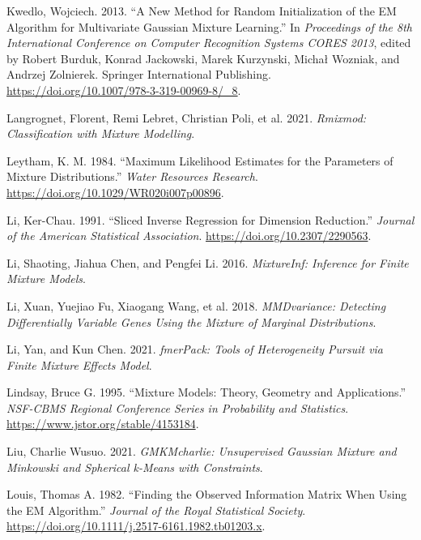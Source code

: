 \begin{CSLReferences}{1}{0}
\leavevmode{}%
Kwedlo, Wojciech. 2013. {``A {New Method} for {Random Initialization} of the {EM Algorithm} for {Multivariate Gaussian Mixture Learning}.''} In \emph{Proceedings of the {8th International Conference} on {Computer Recognition Systems CORES 2013}}, edited by Robert Burduk, Konrad Jackowski, Marek Kurzynski, Michał Wozniak, and Andrzej Zolnierek. Springer International Publishing. \url{https://doi.org/10.1007/978-3-319-00969-8/_8}.

\leavevmode{}%
Langrognet, Florent, Remi Lebret, Christian Poli, et al. 2021. \emph{Rmixmod: Classification with Mixture Modelling}.

\leavevmode{}%
Leytham, K. M. 1984. {``Maximum {Likelihood Estimates} for the {Parameters} of {Mixture Distributions}.''} \emph{Water Resources Research}. \url{https://doi.org/10.1029/WR020i007p00896}.

\leavevmode{}%
Li, Ker-Chau. 1991. {``Sliced {Inverse} {Regression} for {Dimension} {Reduction}.''} \emph{Journal of the American Statistical Association}. \url{https://doi.org/10.2307/2290563}.

\leavevmode{}%
Li, Shaoting, Jiahua Chen, and Pengfei Li. 2016. \emph{MixtureInf: Inference for Finite Mixture Models}.

\leavevmode{}%
Li, Xuan, Yuejiao Fu, Xiaogang Wang, et al. 2018. \emph{MMDvariance: Detecting Differentially Variable Genes Using the Mixture of Marginal Distributions}.

\leavevmode{}%
Li, Yan, and Kun Chen. 2021. \emph{fmerPack: Tools of Heterogeneity Pursuit via Finite Mixture Effects Model}.

\leavevmode{}%
Lindsay, Bruce G. 1995. {``Mixture {Models}: {Theory}, {Geometry} and {Applications}.''} \emph{NSF-CBMS Regional Conference Series in Probability and Statistics}. \url{https://www.jstor.org/stable/4153184}.

\leavevmode{}%
Liu, Charlie Wusuo. 2021. \emph{GMKMcharlie: Unsupervised Gaussian Mixture and Minkowski and Spherical k-Means with Constraints}.

\leavevmode{}%
Louis, Thomas A. 1982. {``Finding the {Observed Information Matrix} When {Using} the {EM Algorithm}.''} \emph{Journal of the Royal Statistical Society}. \url{https://doi.org/10.1111/j.2517-6161.1982.tb01203.x}.


\end{CSLReferences}
